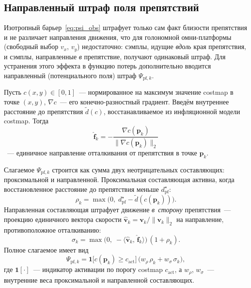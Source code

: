 \subsection{Направленный штраф поля препятствий}
\label{sec:pf_cost}

Изотропный барьер~\eqref{eq:psi_obs} штрафует только сам факт
близости препятствия и не различает направления движения, что для
голономной омни-платформы (свободный выбор $v_x$, $v_y$) недостаточно:
сэмплы, идущие \emph{вдоль} края препятствия, и сэмплы, направленные
\emph{в} препятствие, получают одинаковый штраф. Для устранения этого
эффекта в функцию потерь дополнительно вводится направленный (потенциального
поля) штраф $\Psi_{\text{pf},k}$.

Пусть $c(x,y) \in [0,1]$~--- нормированное на максимум значение
costmap в точке $(x,y)$, $\nabla c$~--- его конечно-разностный градиент.
Введём внутреннее расстояние до препятствия $\tilde{d}(c)$,
восстанавливаемое из инфляционной модели costmap. Тогда
\begin{equation}
\hat{\mathbf{f}}_k =
-\frac{\nabla c(\mathbf{p}_k)}{\|\nabla c(\mathbf{p}_k)\|_2}
\label{eq:pf_dir}
\end{equation}
~--- единичное направление отталкивания от препятствия в точке
$\mathbf{p}_k$.

Слагаемое $\Psi_{\text{pf},k}$ строится как сумма двух
неотрицательных составляющих: проксимальной и направленной.
Проксимальная составляющая активна, когда восстановленное расстояние
до препятствия меньше $d^{\star}_{\text{pf}}$:
\begin{equation}
\rho_k = \max\bigl(0,\; d^{\star}_{\text{pf}} - \tilde{d}(c(\mathbf{p}_k))\bigr).
\label{eq:pf_prox}
\end{equation}
Направленная составляющая штрафует движение
\emph{в~сторону} препятствия~--- проекцию единичного вектора
скорости $\hat{\mathbf{v}}_k = \mathbf{v}_k / \|\mathbf{v}_k\|_2$ на
направление, противоположное отталкиванию:
\begin{equation}
\sigma_k = \max\bigl(0,\; -\langle \hat{\mathbf{v}}_k,\, \hat{\mathbf{f}}_k \rangle\bigr)
\,(1 + \rho_k).
\label{eq:pf_dir_score}
\end{equation}
Полное слагаемое имеет вид
\begin{equation}
\Psi_{\text{pf},k} = \mathbf{1}\!\bigl[c(\mathbf{p}_k) \ge c_{\text{act}}\bigr]\,
\bigl(w_{\rho}\,\rho_k + w_{\sigma}\,\sigma_k\bigr),
\label{eq:psi_pf}
\end{equation}
где $\mathbf{1}[\cdot]$~--- индикатор активации по порогу costmap
$c_{\text{act}}$, а $w_{\rho}$, $w_{\sigma}$~--- внутренние веса
проксимальной и направленной составляющих.

